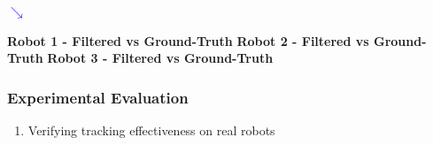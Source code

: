 \begin{frame}
	\vspace{-1.17cm}
	
	\begin{tabbing}
		\footnotesize
		\hspace{9.99cm}
		\textcolor{blue}{$ \searrow $}
	\end{tabbing}
	
	\vspace{0.01cm}
	
	\begin{tabbing}
		\hspace{0.21cm}
		\tiny
		\textbf{Robot 1 - Filtered vs Ground-Truth}
		\hspace{0.53cm}
		\textbf{Robot 2 - Filtered vs Ground-Truth}
		\hspace{0.53cm}
		\textbf{Robot 3 - Filtered vs Ground-Truth}
	\end{tabbing}
\end{frame}

\begin{frame}
	\frametitle{Experimental Evaluation}
	
	\Large
	
	\vspace{0.3cm}
	
	\begin{enumerate}
		\conti
		
		\item Verifying tracking effectiveness on real robots
	\end{enumerate}
	
	\vspace{-0.2cm}
	
	\begin{figure}
		\centering
		
	\end{figure}
\end{frame}
